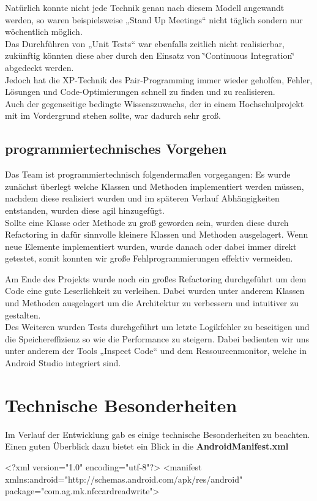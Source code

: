 \documentclass[a4paper,ngerman,12pt]{scrreprt}
\newcommand{\+}{\discretionary{\mbox{\scriptsize$\hookleftarrow$}}{}{}}
\begin{document}
Natürlich konnte nicht jede Technik genau nach diesem Modell angewandt werden, so waren beispielsweise „\+Stand Up Meetings“ nicht täglich sondern nur wöchentlich möglich.\\ 
Das Durchführen von „\+Unit Tests“ war ebenfalls zeitlich nicht realisierbar, zukünftig könnten diese aber durch den Einsatz von \char`\"{}\+\ac{Continuous Integration}\char`\"{} abgedeckt werden. \\
Jedoch hat die X\+P-\/\+Technik des Pair-\/\+Programming immer wieder geholfen, Fehler, Lösungen und Code-\/\+Optimierungen schnell zu finden und zu realisieren. \\
Auch der gegenseitige bedingte Wissenszuwachs, der in einem Hochschulprojekt mit im Vordergrund stehen sollte, war dadurch sehr groß.

\subsection{programmiertechnisches Vorgehen}

Das Team ist programmiertechnisch folgendermaßen vorgegangen\+: Es wurde zunächst überlegt welche Klassen und Methoden implementiert werden müssen, nachdem diese realisiert wurden und im späteren Verlauf Abhängigkeiten entstanden, wurden diese agil hinzugefügt. \\
Sollte eine Klasse oder Methode zu groß geworden sein, wurden diese durch \ac{Refactoring} in dafür sinnvolle kleinere Klassen und Methoden ausgelagert. Wenn neue Elemente implementiert wurden, wurde danach oder dabei immer direkt getestet, somit konnten wir große Fehlprogrammierungen effektiv vermeiden.

Am Ende des Projekts wurde noch ein großes Refactoring durchgeführt um dem Code eine gute Leserlichkeit zu verleihen. Dabei wurden unter anderem Klassen und Methoden ausgelagert um die Architektur zu verbessern und intuitiver zu gestalten. \\
Des Weiteren wurden Tests durchgeführt um letzte Logikfehler zu beseitigen und die Speichereffizienz so wie die Performance zu steigern. Dabei bedienten wir uns unter anderem der Tools „\+Inspect Code“ und dem Ressourcenmonitor, welche in Android Studio integriert sind.

\section{Technische Besonderheiten}

Im Verlauf der Entwicklung gab es einige technische Besonderheiten zu beachten. Einen guten Überblick dazu bietet ein Blick in die {\bfseries Android\+Manifest.\+xml} \begin{DoxyVerb}<?xml version="1.0" encoding="utf-8"?>
<manifest xmlns:android="http://schemas.android.com/apk/res/android"
    package="com.ag.mk.nfccardreadwrite">
\end{DoxyVerb}
\end{document}
